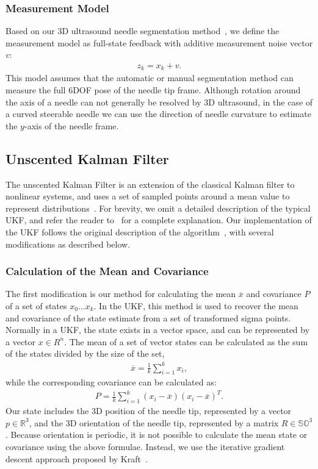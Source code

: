 \subsubsection{Measurement Model}
Based on our 3D ultrasound needle segmentation method~\cite{Adebar2013}, we define the measurement model as full-state feedback with additive measurement noise vector ${v}$:
\begin{align}
{z_{k}} = {x_k} + {v}.
\end{align}
This model assumes that the automatic or manual segmentation method can measure the full 6DOF pose of the needle tip frame. Although rotation around the axis of a needle can not generally be resolved by 3D ultrasound, in the case of a curved steerable needle we can use the direction of needle curvature to estimate the $y$-axis of the needle frame.

\subsection{Unscented Kalman Filter}
The unscented Kalman Filter is an extension of the classical Kalman filter to nonlinear systems, and uses a set of sampled points around a mean value to represent distributions~\cite{Julier1997}. For brevity, we omit a detailed description of the typical UKF, and refer the reader to~\cite{Thrun2005} for a complete explanation. Our implementation of the UKF follows the original description of the algorithm~\cite{Julier1997}, with several modifications as described below. 

\subsubsection{Calculation of the Mean and Covariance}
The first modification is our method for calculating the mean $\overline{x}$ and covariance $P$ of a set of states $x_0 \dots x_k$. In the UKF, this method is used to recover the mean and covariance of the state estimate from a set of transformed sigma points. Normally in a UKF, the state exists in a vector space, and can be represented by a vector $x \in R^n$. The mean of a set of vector states can be calculated as the sum of the states divided by the size of the set,
\begin{align}
\overline{x} = \frac{1}{k}\sum\limits_{i=1}^{k} x_i,
\end{align}
\noindent 
while the corresponding covariance can be calculated as:
\begin{align}
P = \frac{1}{k}\sum\limits_{i=1}^{k} (x_i-\overline{x})(x_i-\overline{x})^T.
\end{align}
\noindent
Our state includes the 3D position of the needle tip, represented by a vector ${p} \in \mathbb{R}^3$, and the 3D orientation of the needle tip, represented by a matrix ${R} \in \mathbb{SO}^3$. Because orientation is periodic, it is not possible to calculate the mean state or covariance using the above formulae. Instead, we use the iterative gradient descent approach proposed by Kraft~\cite{Kraft2003}. 

